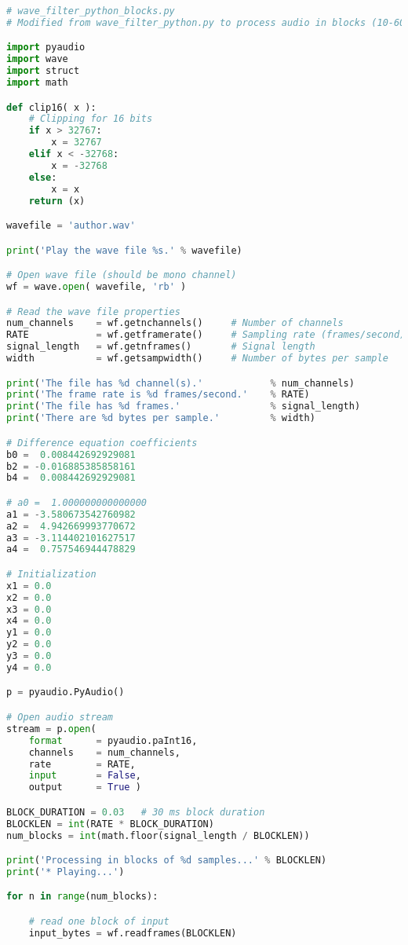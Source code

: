 \documentclass[11pt]{article}
\begin{document}
\begin{lstlisting}[language=python, label={lst:code}, breaklines=true, ]
# wave_filter_python_blocks.py
# Modified from wave_filter_python.py to process audio in blocks (10-60 ms)

import pyaudio
import wave
import struct
import math

def clip16( x ):    
    # Clipping for 16 bits
    if x > 32767:
        x = 32767
    elif x < -32768:
        x = -32768
    else:
        x = x        
    return (x)

wavefile = 'author.wav'

print('Play the wave file %s.' % wavefile)

# Open wave file (should be mono channel)
wf = wave.open( wavefile, 'rb' )

# Read the wave file properties
num_channels    = wf.getnchannels()     # Number of channels
RATE            = wf.getframerate()     # Sampling rate (frames/second)
signal_length   = wf.getnframes()       # Signal length
width           = wf.getsampwidth()     # Number of bytes per sample

print('The file has %d channel(s).'            % num_channels)
print('The frame rate is %d frames/second.'    % RATE)
print('The file has %d frames.'                % signal_length)
print('There are %d bytes per sample.'         % width)

# Difference equation coefficients
b0 =  0.008442692929081
b2 = -0.016885385858161
b4 =  0.008442692929081

# a0 =  1.000000000000000
a1 = -3.580673542760982
a2 =  4.942669993770672
a3 = -3.114402101627517
a4 =  0.757546944478829

# Initialization
x1 = 0.0
x2 = 0.0
x3 = 0.0
x4 = 0.0
y1 = 0.0
y2 = 0.0
y3 = 0.0
y4 = 0.0

p = pyaudio.PyAudio()

# Open audio stream
stream = p.open(
    format      = pyaudio.paInt16,
    channels    = num_channels,
    rate        = RATE,
    input       = False,
    output      = True )

BLOCK_DURATION = 0.03   # 30 ms block duration
BLOCKLEN = int(RATE * BLOCK_DURATION)
num_blocks = int(math.floor(signal_length / BLOCKLEN))

print('Processing in blocks of %d samples...' % BLOCKLEN)
print('* Playing...')

for n in range(num_blocks):

    # read one block of input 
    input_bytes = wf.readframes(BLOCKLEN)


\end{lstlisting}
\end{document}
